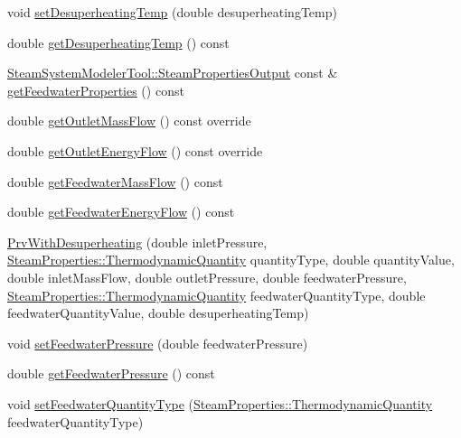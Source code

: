 \begin{DoxyCompactItemize}
\item 
void \hyperlink{class_prv_with_desuperheating_ade1b153c495efb451006b3c054ff386e}{set\+Desuperheating\+Temp} (double desuperheating\+Temp)
\item 
double \hyperlink{class_prv_with_desuperheating_af334a9ff9a14d110cb2851a76d5d84fb}{get\+Desuperheating\+Temp} () const
\item 
\hyperlink{struct_steam_system_modeler_tool_1_1_steam_properties_output}{Steam\+System\+Modeler\+Tool\+::\+Steam\+Properties\+Output} const  \& \hyperlink{class_prv_with_desuperheating_a8f4594109bda9bc4030c23cee9841fa8}{get\+Feedwater\+Properties} () const
\item 
double \hyperlink{class_prv_with_desuperheating_a76c03ff2f54c85cd0c80543f23549635}{get\+Outlet\+Mass\+Flow} () const override
\item 
double \hyperlink{class_prv_with_desuperheating_a2394fb62e4fc85252fc4eb15f08e9f1e}{get\+Outlet\+Energy\+Flow} () const override
\item 
double \hyperlink{class_prv_with_desuperheating_a9bd8ee7d5b563110a7279102352b8f4d}{get\+Feedwater\+Mass\+Flow} () const
\item 
double \hyperlink{class_prv_with_desuperheating_a42945a77fcdbaf1e1844c444c696f8b0}{get\+Feedwater\+Energy\+Flow} () const
\item 
\hyperlink{class_prv_with_desuperheating_adfd7f6866e8b953dcc41e51bb5b31b58}{Prv\+With\+Desuperheating} (double inlet\+Pressure, \hyperlink{class_steam_properties_ae0294bedf7d178c2d8fb6aed0f62fbff}{Steam\+Properties\+::\+Thermodynamic\+Quantity} quantity\+Type, double quantity\+Value, double inlet\+Mass\+Flow, double outlet\+Pressure, double feedwater\+Pressure, \hyperlink{class_steam_properties_ae0294bedf7d178c2d8fb6aed0f62fbff}{Steam\+Properties\+::\+Thermodynamic\+Quantity} feedwater\+Quantity\+Type, double feedwater\+Quantity\+Value, double desuperheating\+Temp)
\item 
void \hyperlink{class_prv_with_desuperheating_a8494ebf87e5bd834f621b0c7ca257fbe}{set\+Feedwater\+Pressure} (double feedwater\+Pressure)
\item 
double \hyperlink{class_prv_with_desuperheating_a260bbe19272694af509fb408a821b041}{get\+Feedwater\+Pressure} () const
\item 
void \hyperlink{class_prv_with_desuperheating_a3efaf028d1e6b8349a9e064605cc8d7a}{set\+Feedwater\+Quantity\+Type} (\hyperlink{class_steam_properties_ae0294bedf7d178c2d8fb6aed0f62fbff}{Steam\+Properties\+::\+Thermodynamic\+Quantity} feedwater\+Quantity\+Type)

\end{DoxyCompactItemize}
